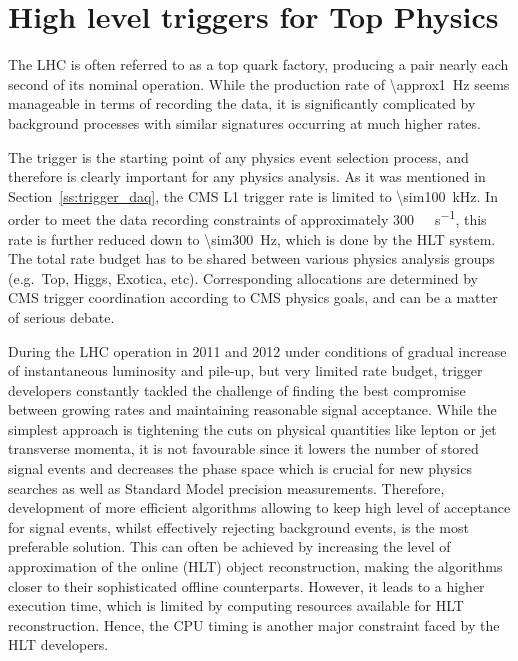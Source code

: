 
\chapter{High level triggers for Top Physics}
\label{c:service_work}
\ifpdf
    \graphicspath{{04_Service_work/plots/}}
\else
    \graphicspath{{04_Service_work/plots/EPS/}{04_Service_work/plots/}}
\fi

The LHC is often referred to as a top quark factory, producing a \ttbar pair nearly each second of its nominal
operation. While the production rate of \SI{\approx1}{\Hz} seems manageable in terms of recording the data, it is
significantly complicated by background processes with similar signatures occurring at much higher rates.

The trigger is the starting point of any physics event selection process, and therefore is clearly important for any
physics analysis. As it was mentioned in Section~\ref{ss:trigger_daq}, the CMS L1 trigger rate is limited to
\SI{\sim100}{\kilo\hertz}. In order to meet the data recording constraints of approximately
\SI{300}{\mega\byte\per\second}, this rate is further reduced down to \SI{\sim300}{\Hz}, which is done by the HLT
system. The total rate budget has to be shared between various physics analysis groups (e.g.\ Top, Higgs, Exotica,
etc). Corresponding allocations are determined by CMS trigger coordination according to CMS physics goals, and can be a
matter of serious debate.

During the LHC operation in 2011 and 2012 under conditions of gradual increase of instantaneous luminosity and pile-up,
but very limited rate budget, trigger developers constantly tackled the challenge of finding the best compromise between
growing rates and maintaining reasonable signal acceptance. While the simplest approach is tightening the cuts on
physical quantities like lepton or jet transverse momenta, it is not favourable since it lowers the number of stored
signal events and decreases the phase space which is crucial for new physics searches as well as Standard Model
precision measurements. Therefore, development of more efficient algorithms allowing to keep high level of acceptance
for signal events, whilst effectively rejecting background events, is the most preferable solution. This can often be
achieved by increasing the level of approximation of the online (HLT) object reconstruction, making the algorithms
closer to their sophisticated offline counterparts. However, it leads to a higher execution time, which is limited by
computing resources available for HLT reconstruction. Hence, the CPU timing is another major constraint faced by the HLT
developers.

